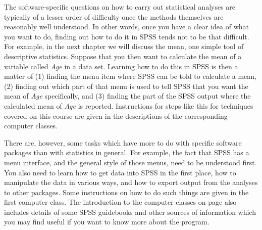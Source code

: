 The software-specific questions on how to carry out statistical analyses are
typically of a lesser order of difficulty once the methods
themselves are reasonably well understood. In other words, once you have
a clear idea of what you want to do, finding out how to do it in SPSS
tends not to be that difficult. For example, in the next chapter we will
discuss the mean, one simple tool of descriptive statistics. Suppose
that you then want to calculate the mean of a variable called \emph{Age}
in a data set. Learning how to do this in SPSS is then a matter of (1)
finding the menu item where SPSS can be told to calculate a mean, (2)
finding out which part of that menu is used to tell SPSS that you want
the mean of \emph{Age} specifically, and (3) finding the part of the
SPSS output where the calculated mean of \emph{Age} is reported.
Instructions for steps like this for techniques covered on this course
are given in the descriptions of the corresponding computer classes.

There are, however, some tasks which have more to do with specific
software packages than with statistics in general. For example, the fact
that SPSS has a menu interface, and the general style of those menus,
need to be understood first. You also need to learn how to get data into
SPSS in the first place, how to manipulate the data in various ways, and
how to export output from the analyses to other packages. Some
instructions on how to do such things are given in the first computer
class. The introduction to the computer classes on page
\pageref{c_class0} also includes details of some SPSS guidebooks and
other sources of information which you may find useful if you want to
know more about the program.
